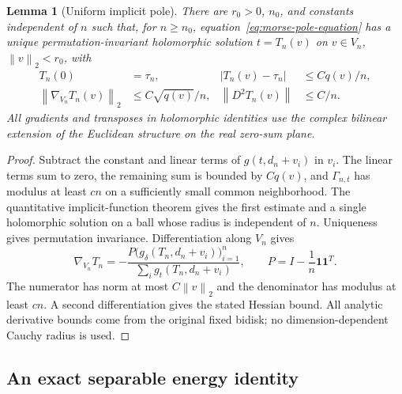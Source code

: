 \documentclass[11pt]{article}
\numberwithin{equation}{section}
\newtheorem{lemma}[theorem]{Lemma}
\theoremstyle{definition}
\newcommand{\norm}[1]{\left\lVert#1\right\rVert}
\begin{document}
\begin{lemma}[Uniform implicit pole]
\label{lem:morse-implicit}
There are $r_0>0$, $n_0$, and constants independent of $n$ such that, for
$n\ge n_0$, equation~\eqref{eq:morse-pole-equation} has a unique
permutation-invariant holomorphic solution $t=T_n(v)$ on
$v\in V_n$, $\norm{v}_2<r_0$, with
\begin{align}
 T_n(0)&=\tau_n,&
 |T_n(v)-\tau_n|&\le Cq(v)/n,\label{eq:morse-T-bound}\\
 \norm{\nabla_{V_n}T_n(v)}_2&\le C\sqrt{q(v)}/n,&
 \norm{D^2T_n(v)}&\le C/n.\label{eq:morse-T-derivatives}
\end{align}
All gradients and transposes in holomorphic identities use the complex
bilinear extension of the Euclidean structure on the real zero-sum plane.
\end{lemma}

\begin{proof}
Subtract the constant and linear terms of $g(t,d_n+v_i)$ in $v_i$.
The linear terms sum to zero, the remaining sum is bounded by $Cq(v)$,
and $\Gamma_{n,t}$ has modulus at least $cn$ on a sufficiently small
common neighborhood.  The quantitative implicit-function theorem gives
the first estimate and a single holomorphic solution on a ball whose
radius is independent of $n$.  Uniqueness gives permutation invariance.
Differentiation along $V_n$ gives
\[
 \nabla_{V_n}T_n
 =-\frac{P\bigl(g_\delta(T_n,d_n+v_i)\bigr)_{i=1}^n}
 {\sum_i g_t(T_n,d_n+v_i)},
 \qquad P=I-\frac1n\mathbf1\mathbf1^T.
\]
The numerator has norm at most $C\norm v_2$ and the denominator has
modulus at least $cn$.  A second differentiation gives the stated
Hessian bound.  All analytic derivative bounds come from the original
fixed bidisk; no dimension-dependent Cauchy radius is used.
\end{proof}

\subsection{An exact separable energy identity}
\end{document}

